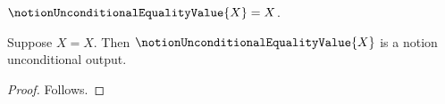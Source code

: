

\begin{definition}\label{notion_unconditional_equality_value}
    $\notionUnconditionalEqualityValue{X}=X$.
\end{definition}

\begin{classification}\label{notion_unconditional_equality_header}
    Suppose $X=X$.
    Then $\notionUnconditionalEqualityValue{X}$ is a notion unconditional output.
\end{classification}
\begin{proof}
    Follows.
\end{proof}
